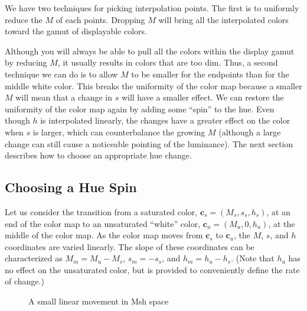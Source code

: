 \documentclass{llncs}
\newcommand{\Msh}{Msh\xspace}
\newcommand*{\cvec}[1]{\mathbf{#1}}
\begin{document}
We have two techniques for picking interpolation points.  The first is to
uniformly reduce the $M$ of each points.  Dropping $M$ will bring all the
interpolated colors toward the gamut of displayable colors.

Although you will always be able to pull all the colors within the display
gamut by reducing $M$, it usually results in colors that are too dim.
Thus, a second technique we can do is to allow $M$ to be smaller for the
endpoints than for the middle white color.  This breaks the uniformity of
the color map because a smaller $M$ will mean that a change in $s$ will
have a smaller effect.  We can restore the uniformity of the color map
again by adding some ``spin'' to the hue.  Even though $h$ is interpolated
linearly, the changes have a greater effect on the color when $s$ is
larger, which can counterbalance the growing $M$ (although a large change
can still cause a noticeable pointing of the luminance).  The next section
describes how to choose an appropriate hue change.

\subsection{Choosing a Hue Spin}
\label{sec:ChoosingAHueSpin}

Let us consider the transition from a saturated color, $\cvec{c}_s=(M_s,
s_s, h_s)$, at an end of the color map to an unsaturated ``white'' color,
$\cvec{c}_u=(M_u, 0, h_u)$, at the middle of the color map.  As the
color map moves from $\cvec{c}_s$ to $\cvec{c}_u$, the $M$, $s$, and $h$
coordinates are varied linearly.  The slope of these coordinates can be
characterized as $M_m = M_u - M_s$, $s_m = -s_s$, and $h_m = h_u - h_s$.
(Note that $h_u$ has no effect on the unsaturated color, but is provided to
conveniently define the rate of change.)

\begin{figure}
  \centering
  \caption{A small linear movement in \Msh space}
  \label{sec:LinearMshMovement}
\end{figure}
\end{document}
